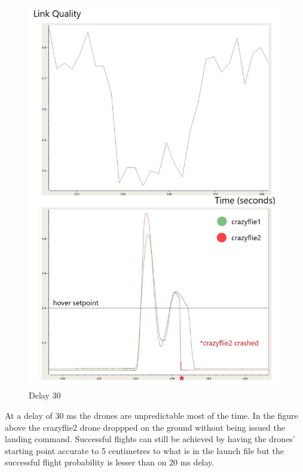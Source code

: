 \begin{figure}[H]
\centering
 \includegraphics[scale=0.35]{Figures/delay_30.jpg}
 \caption{Delay 30}
 \label{figure:rssi}
\end{figure}

\noindent At a delay of 30 ms the drones are unpredictable most of the time. In the figure above the crazyflie2 drone droppped on the ground without being issued the landing command. Successful flights can still be achieved by having the drones' starting point accurate to 5 centimetres to what is in the launch file but the successful flight probability is lesser than on 20 ms delay.